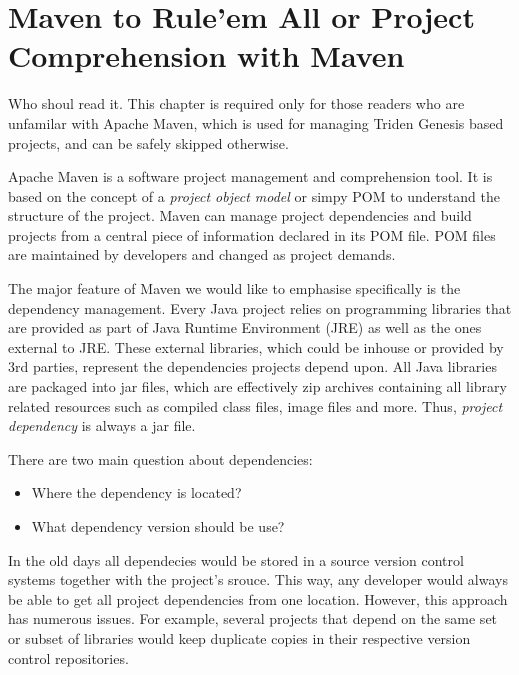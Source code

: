 \chapter{Maven to Rule'em All or Project Comprehension with Maven}\label{ch00:01}



  \begin{notebox}{Who shoul read it.}{\label{mb:skip}}
    This chapter is required only for those readers who are unfamilar with Apache Maven, which is used for managing Triden Genesis based projects, and can be safely skipped otherwise.
  \end{notebox}
  
  Apache Maven is a software project management and comprehension tool. 
  It is based on the concept of a \emph{project object model} or simpy POM to understand the structure of the project. 
  Maven can manage project dependencies and build projects from a central piece of information declared in its POM file.
  POM files are maintained by developers and changed as project demands.

  The major feature of Maven we would like to emphasise specifically is the dependency management.
  Every Java project relies on programming libraries that are provided as part of Java Runtime Environment (JRE) as well as the ones external to JRE.
  These external libraries, which could be inhouse or provided by 3rd parties, represent the dependencies projects depend upon.
  All Java libraries are packaged into jar files, which are effectively zip archives containing all library related resources such as compiled class files, image files and more.
  Thus, \emph{project dependency} is always a jar file.

  There are two main question about dependencies: 
  \begin{itemize}
    \item Where the dependency is located?
    \item What dependency version should be use?
  \end{itemize}

  In the old days all dependecies would be stored in a source version control systems together with the project's srouce.
  This way, any developer would always be able to get all project dependencies from one location.
  However, this approach has numerous issues.
  For example, several projects that depend on the same set or subset of libraries would keep duplicate copies in their respective version control repositories.


